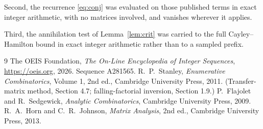 \documentclass[11pt,a4paper]{article}
\theoremstyle{plain}
\theoremstyle{definition}
\begin{document}
Second, the recurrence \eqref{eq:conj} was evaluated on those published terms in exact
integer arithmetic, with no matrices involved, and vanishes wherever it applies.

Third, the annihilation test of Lemma~\ref{lem:crit} was carried to the full
Cayley--Hamilton bound in exact integer arithmetic rather than to a sampled prefix.

\begin{thebibliography}{9}
 The OEIS Foundation, \emph{The On-Line Encyclopedia of Integer
Sequences}, \url{https://oeis.org}, 2026. Sequence A281565.
 R.~P.~Stanley, \emph{Enumerative Combinatorics}, Volume 1, 2nd ed.,
Cambridge University Press, 2011. (Transfer-matrix method, Section 4.7; falling-factorial
inversion, Section 1.9.)
 P.~Flajolet and R.~Sedgewick, \emph{Analytic Combinatorics}, Cambridge
University Press, 2009.
 R.~A.~Horn and C.~R.~Johnson, \emph{Matrix Analysis}, 2nd ed., Cambridge
University Press, 2013.
\end{thebibliography}
\end{document}
